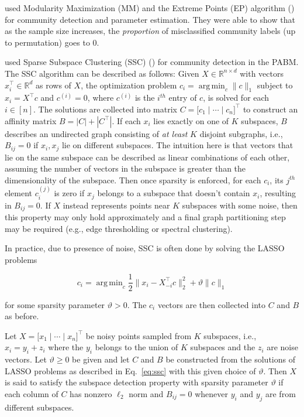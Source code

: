 \documentclass[12pt]{article}
\DeclareMathOperator*{\argmin}{arg\,min}
\begin{document}
\citet{307cbeb9b1be48299388437423d94bf1} 
used Modularity Maximization (MM) and the Extreme Points (EP)
algorithm (\cite{le2016}) for community detection and parameter
estimation. They were able to show that as the sample size increases,
the {\em proportion} of misclassified community labels (up to permutation)
goes to 0.

\citet{noroozi2019estimation} used Sparse Subspace Clustering (SSC) 
(\cite{5206547}) for community detection in the PABM. 
The SSC algorithm can be described as follows: 
Given \(X \in \mathbb{R}^{n \times d}\) with vectors
\(x_i^\top \in \mathbb{R}^d\) as rows of \(X\), the optimization problem
\(c_i = \argmin_{c} \|c\|_1\) subject to \(x_i = X^\top c\) and
\(c^{(i)} = 0\), where $c^{(i)}$ is the $i^{th}$ entry of $c$, is solved for each \(i \in [n]\). 
The solutions are collected into matrix
\(C = \bigl[ c_1 \mid \cdots \mid c_n \bigr]^\top\) to
construct an affinity matrix \(B = |C| + |C^\top|\). If each \(x_i\) lies
exactly on one of \(K\) subspaces, \(B\) describes an undirected graph
consisting of {\em at least} \(K\) disjoint subgraphs, i.e., \(B_{ij} = 0\) if \(x_i, x_j\) lie on different subspaces. 
The intuition here is that vectors that lie on the same subspace can be described as linear combinations of each other, assuming the number of vectors in the subspace is greater than the dimensionality of the subspace. 
Then once sparsity is enforced, for each $c_i$, its $j^{th}$ element $c_i^{(j)}$ is zero if $x_j$ belongs to a subspace that doesn't contain $x_i$, resulting in $B_{ij} = 0$. 
If \(X\) instead represents points near \(K\) subspaces with some noise, 
then this property may only hold approximately and a final graph partitioning step may be required 
(e.g., edge thresholding or spectral clustering).

In practice, due to presence of noise, SSC is often done by solving the LASSO problems

\begin{equation} \label{eq:ssc}
c_i = \argmin_c \frac{1}{2} \|x_i - X_{-i}^\top c\|^2_2 + \vartheta \|c\|_1
\end{equation}

for some sparsity parameter \(\vartheta > 0\). 
The \(c_i\) vectors are then collected into \(C\) and \(B\) as before.

\begin{definition}
  \label{def:subspace_detection}
Let $X = \bigl[ x_1 \mid \cdots \mid x_n \bigr]^\top$ be noisy
points sampled from $K$ subspaces, i.e., $x_i = y_i + z_i$ where the
$y_i$ belongs to the union of $K$ subspaces and the $z_i$ are noise
vectors. Let $\vartheta \geq 0$ be given and
let $C$ and $B$ be constructed from the
solutions of LASSO problems as described in Eq.~\eqref{eq:ssc} with
this given choice of $\vartheta$. Then $X$
is said to satisfy the subspace detection property 
with sparsity parameter $\vartheta$ if each column of
$C$ has nonzero $\ell_2$ norm and $B_{ij} = 0$ whenever $y_i$ and $y_j$ are
from different subspaces.
\end{definition}
\end{document}
